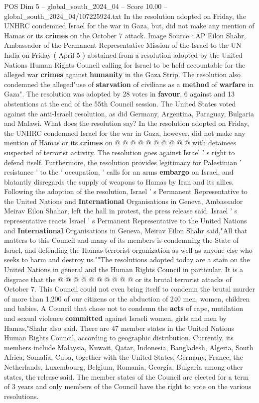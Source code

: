 \begin{textsample}{POS Dim 5 – global\_south\_2024\_04 – Score 10.00 – global\_south\_2024\_04/107225924.txt}  \label{ex:f5_pos_340}
In the resolution adopted on Friday, the UNHRC condemned Israel for the war in Gaza, but, did not make any mention of Hamas or its \textbf{crimes} on the October 7 attack.
Image Source : AP Eilon Shahr, Ambassador of the Permanent Representative Mission of the Israel to the UN India on Friday ( April 5 ) abstained from a resolution adopted by the United Nations Human Rights Council calling for Israel to be held accountable for the alleged war \textbf{crimes} against \textbf{humanity} in the Gaza Strip.
The resolution also condemned the alleged"use of \textbf{starvation} of civilians as a \textbf{method} of \textbf{warfare} in Gaza".
The resolution was adopted by 28 votes in \textbf{favour}, 6 against and 13 abstentions at the end of the 55th Council session.
The United States voted against the anti-Israeli resolution, as did Germany, Argentina, Paraguay, Bulgaria and Malawi.
What does the resolution say?
In the resolution adopted on Friday, the UNHRC condemned Israel for the war in Gaza, however, did not make any mention of Hamas or its \textbf{crimes} on @ @ @ @ @ @ @ @ @ @ with detainees suspected of terrorist activity.
The resolution goes against Israel ' s right to defend itself.
Furthermore, the resolution provides legitimacy for Palestinian ' resistance ' to the ' occupation, ' calls for an arms \textbf{embargo} on Israel, and blatantly disregards the supply of weapons to Hamas by Iran and its allies.
Following the adoption of the resolution, Israel ' s Permanent Representative to the United Nations and \textbf{International} Organisations in Geneva, Ambassador Meirav Eilon Shahar, left the hall in protest, the press release said.
Israel ' s representative reacts Israel ' s Permanent Representative to the United Nations and \textbf{International} Organisations in Geneva, Meirav Eilon Shahr said,"All that matters to this Council and many of its members is condemning the State of Israel, and defending the Hamas terrorist organization as well as anyone else who seeks to harm and destroy us.""The resolutions adopted today are a stain on the United Nations in general and the Human Rights Council in particular.
It is a disgrace that the @ @ @ @ @ @ @ @ @ @ or its brutal terrorist attacks of October 7.
This Council could not even bring itself to condemn the brutal murder of more than 1,200 of our citizens or the abduction of 240 men, women, children and babies.
A Council that chose not to condemn the \textbf{acts} of rape, mutilation and sexual violence \textbf{committed} against Israeli women, girls and men by Hamas,"Shahr also said.
There are 47 member states in the United Nations Human Rights Council, according to geographic distribution.
Currently, its members include Malaysia, Kuwait, Qatar, Indonesia, Bangladesh, Algeria, South Africa, Somalia, Cuba, together with the United States, Germany, France, the Netherlands, Luxembourg, Belgium, Romania, Georgia, Bulgaria among other states, the release said.
The member states of the Council are elected for a term of 3 years and only members of the Council have the right to vote on the various resolutions.

\end{textsample}
